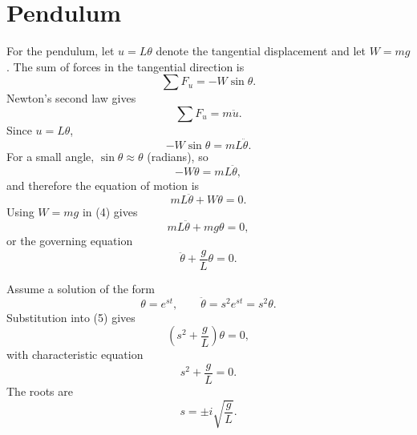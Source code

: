 \section*{Pendulum}


For the pendulum, let $u=L\theta$ denote the tangential displacement and let $W=mg$.
The sum of forces in the tangential direction is
\begin{equation}
    \sum F_u=-W\sin\theta.
    \tag{1}
\end{equation}
Newton's second law gives
\begin{equation}
    \sum F_u=m\ddot{u}.
    \tag{1a}
\end{equation}
Since $u=L\theta$,
\begin{equation}
    -W\sin\theta=mL\ddot{\theta}.
    \tag{2}
\end{equation}
For a small angle, $\sin\theta\approx\theta$ (radians), so
\begin{equation}
    -W\theta=mL\ddot{\theta},
    \tag{3}
\end{equation}
and therefore the equation of motion is
\begin{equation}
    mL\ddot{\theta}+W\theta=0.
    \tag{4}
\end{equation}
Using $W=mg$ in (4) gives
\begin{equation*}
    mL\ddot{\theta}+mg\theta=0,
\end{equation*}
or the governing equation
\begin{equation}
    \ddot{\theta}+\frac{g}{L}\theta=0.
    \tag{5}
\end{equation}

Assume a solution of the form
\begin{equation}
    \theta=e^{st}, \qquad \ddot{\theta}=s^2e^{st}=s^2\theta.
    \tag{6}
\end{equation}
Substitution into (5) gives
\begin{equation}
    \left(s^2+\frac{g}{L}\right)\theta=0,
    \tag{7}
\end{equation}
with characteristic equation
\begin{equation}
    s^2+\frac{g}{L}=0.
    \tag{8}
\end{equation}
The roots are
\begin{equation}
    s=\pm i\sqrt{\frac{g}{L}}.
    \tag{9}
\end{equation}
